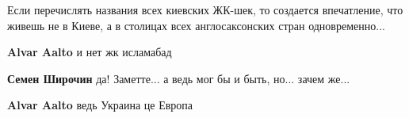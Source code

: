 \begin{itemize}
Если перечислять названия всех киевских ЖК-шек, то создается впечатление, что
живешь не в Киеве, а в столицах всех англосаксонских стран одновременно...

\begin{itemize}
 
\textbf{Alvar Aalto} и нет жк исламабад

 
\textbf{Семен Широчин} да! Заметте... а ведь мог бы и быть, но... зачем же...

 
\textbf{Alvar Aalto} ведь Украина це Европа
\end{itemize}

\end{itemize}

